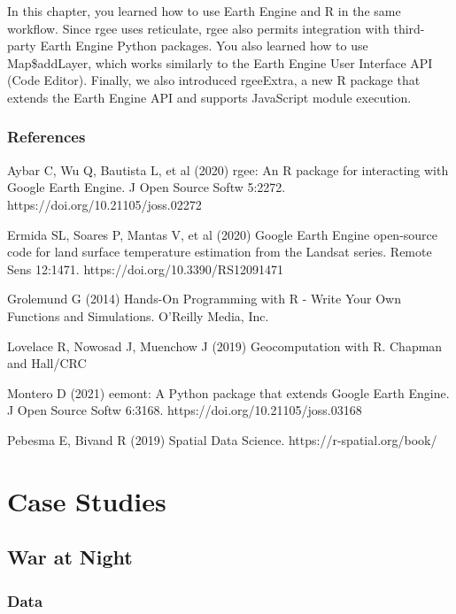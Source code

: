 \documentclass[
  letterpaper,
  DIV=11,
  numbers=noendperiod]{scrreprt}
\begin{document}

In this chapter, you learned how to use Earth Engine and R in the same
workflow. Since rgee uses reticulate, rgee also permits integration with
third-party Earth Engine Python packages. You also learned how to use
Map\$addLayer, which works similarly to the Earth Engine User Interface
API (Code Editor). Finally, we also introduced rgeeExtra, a new R
package that extends the Earth Engine API and supports JavaScript module
execution.

\hypertarget{references-18}{%
\section*{References}\label{references-18}}


Aybar C, Wu Q, Bautista L, et al (2020) rgee: An R package for
interacting with Google Earth Engine. J Open Source Softw 5:2272.
https://doi.org/10.21105/joss.02272

Ermida SL, Soares P, Mantas V, et al (2020) Google Earth Engine
open-source code for land surface temperature estimation from the
Landsat series. Remote Sens 12:1471. https://doi.org/10.3390/RS12091471

Grolemund G (2014) Hands-On Programming with R - Write Your Own
Functions and Simulations. O'Reilly Media, Inc.

Lovelace R, Nowosad J, Muenchow J (2019) Geocomputation with R. Chapman
and Hall/CRC

Montero D (2021) eemont: A Python package that extends Google Earth
Engine. J Open Source Softw 6:3168. https://doi.org/10.21105/joss.03168

Pebesma E, Bivand R (2019) Spatial Data Science.
https://r-spatial.org/book/

\part{Case Studies}

\hypertarget{war-at-night}{%
\chapter*{War at Night}\label{war-at-night}}


\hypertarget{data}{%
\section*{Data}\label{data}}
\end{document}

